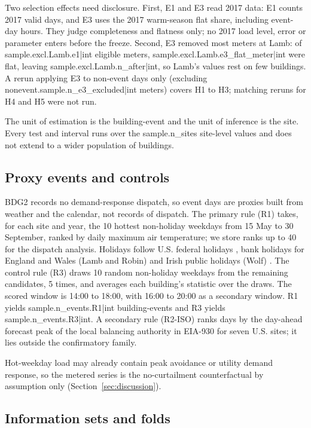 Two selection effects need disclosure. First, E1 and E3 read 2017 data: E1 counts 2017 valid days, and E3 uses the 2017 warm-season flat share, including event-day hours. They judge completeness and flatness only; no 2017 load level, error or parameter enters before the freeze. Second, E3 removed most meters at Lamb: of {{sample.excl.Lamb.e1|int}} eligible meters, {{sample.excl.Lamb.e3_flat_meter|int}} were flat, leaving {{sample.excl.Lamb.n_after|int}}, so Lamb's values rest on few buildings. A rerun applying E3 to non-event days only (excluding {{nonevent.sample.n_e3_excluded|int}} meters) covers H1 to H3; matching reruns for H4 and H5 were not run.

The unit of estimation is the building-event and the unit of inference is the site. Every test and interval runs over the {{sample.n_sites}} site-level values and does not extend to a wider population of buildings.

\subsection{Proxy events and controls}
\label{sec:data:events}

BDG2 records no demand-response dispatch, so event days are proxies built from weather and the calendar, not records of dispatch. The primary rule (R1) takes, for each site and year, the 10 hottest non-holiday weekdays from 15 May to 30 September, ranked by daily maximum air temperature; we store ranks up to 40 for the dispatch analysis. Holidays follow U.S. federal holidays \citep{us5usc6103}, bank holidays for England and Wales (Lamb and Robin) \citep{uk_bfda1971} and Irish public holidays (Wolf) \citep{ie_owta1997}. The control rule (R3) draws 10 random non-holiday weekdays from the remaining candidates, 5 times, and averages each building's statistic over the draws. The scored window is 14:00 to 18:00, with 16:00 to 20:00 as a secondary window. R1 yields {{sample.n_events.R1|int}} building-events and R3 yields {{sample.n_events.R3|int}}. A secondary rule (R2-ISO) ranks days by the day-ahead forecast peak of the local balancing authority in EIA-930 \citep{eia930} for seven U.S. sites; it lies outside the confirmatory family.

Hot-weekday load may already contain peak avoidance or utility demand response, so the metered series is the no-curtailment counterfactual by assumption only (Section~\ref{sec:discussion}).

\subsection{Information sets and folds}
\label{sec:data:folds}

